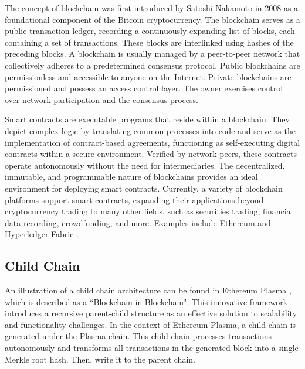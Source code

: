 \documentclass[10pt,journal]{IEEEtran}
\begin{document}
The concept of blockchain was first introduced by Satoshi Nakamoto in 2008 \cite{nakamoto2008bitcoin} as a foundational component of the Bitcoin cryptocurrency. The blockchain serves as a public transaction ledger, recording a continuously expanding list of blocks, each containing a set of transactions. These blocks are interlinked using hashes of the preceding blocks. A blockchain is usually managed by a peer-to-peer network that collectively adheres to a predetermined consensus protocol. Public blockchains are permissionless and accessible to anyone on the Internet. Private blockchains are permissioned and possess an access control layer. The owner exercises control over network participation and the consensus process.


Smart contracts are executable programs that reside within a blockchain. They depict complex logic by translating common processes into code and serve as the implementation of contract-based agreements, functioning as self-executing digital contracts within a secure environment. Verified by network peers, these contracts operate autonomously without the need for intermediaries. The decentralized, immutable, and programmable nature of blockchains provides an ideal environment for deploying smart contracts. Currently, a variety of blockchain platforms support smart contracts, expanding their applications beyond cryptocurrency trading to many other fields, such as securities trading, financial data recording, crowdfunding, and more. Examples include Ethereum \cite{buterin2014next} and Hyperledger Fabric \cite{androulaki2018hyperledger}.


\subsection{Child Chain}

An illustration of a child chain architecture can be found in Ethereum Plasma \cite{poon2017plasma}, which is described as a ``Blockchain in Blockchain". This innovative framework introduces a recursive parent-child structure as an effective solution to scalability and functionality challenges. In the context of Ethereum Plasma, a child chain is generated under the Plasma chain. This child chain processes transactions autonomously and transforms all transactions in the generated block into a single Merkle root hash. Then, write it to the parent chain.
\end{document}
